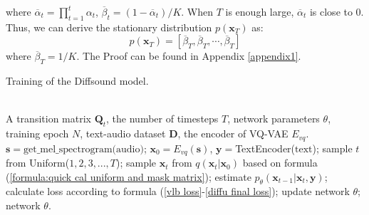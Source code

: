 \documentclass[lettersize,journal]{IEEEtran}
\begin{document}
where $\overline{\alpha}_t=\prod_{t=1}^{t}\alpha_t$, $\overline{\beta}_t=(1- \overline{\alpha}_t)/K$.
When $T$ is enough large, $\overline{\alpha}_t$ is close to 0. Thus, we can derive the stationary distribution $p(\boldsymbol{x}_T)$ as:
\begin{equation}\label{formula:uniform transition matrices}
   p(\boldsymbol{x}_T)=[\overline{\beta}_T, \overline{\beta}_T, \cdots, \overline{\beta}_T]
\end{equation}
where $\overline{\beta}_T=1/K$.
The Proof can be found in Appendix \ref{appendix1}.
\begin{algorithm}[t]
\caption{Training of the Diffsound model.}
\label{alg:PA1}
\begin{algorithmic}[1]
\REQUIRE ~~\\
    A transition matrix $\boldsymbol{Q}_t$, the number of timesteps $T$, network parameters $\theta$, training epoch $N$, text-audio dataset $\boldsymbol{D}$, the encoder of VQ-VAE $E_{vq}$.
    \STATE $\boldsymbol{s} = \mbox{get\_mel\_spectrogram(audio)}$;
    \STATE $\boldsymbol{x}_0 = E_{vq}(\boldsymbol{s})$, $\boldsymbol{y}=$TextEncoder($\mbox{text}$);
    \STATE sample $t$ from Uniform($1, 2, 3, ..., T$);
    \STATE sample $\boldsymbol{x}_t$ from $q(\boldsymbol{x}_t|\boldsymbol{x}_0)$ based on formula (\ref{formula:quick cal uniform and mask matrix});
    \STATE estimate $p_{\theta}(\boldsymbol{x}_{t-1}|\boldsymbol{x}_t,\boldsymbol{y})$;
    \STATE calculate loss according to formula (\ref{vlb loss}-\ref{diffu final loss});
    \STATE update network $\theta$;
    \ENDFOR
    \ENDFOR
\RETURN network $\theta$.
\end{algorithmic}
\end{algorithm}
\end{document}
